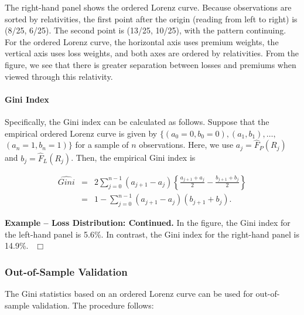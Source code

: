\documentclass[]{book}
\let\oldparagraph\paragraph
\renewcommand{\paragraph}[1]{\oldparagraph{#1}\mbox{}}
\theoremstyle{definition}
\theoremstyle{definition}
\theoremstyle{definition}
\theoremstyle{remark}
\begin{document}
The right-hand panel shows the ordered Lorenz curve. Because
observations are sorted by relativities, the first point after the
origin (reading from left to right) is (8/25, 6/25). The second point is
(13/25, 10/25), with the pattern continuing. For the ordered Lorenz
curve, the horizontal axis uses premium weights, the vertical axis uses
loss weights, and both axes are ordered by relativities. From the
figure, we see that there is greater separation between losses and
premiums when viewed through this relativity.

\paragraph{Gini Index}\label{gini-index}

Specifically, the Gini index can be calculated as follows. Suppose that
the empirical ordered Lorenz curve is given by
\(\{ (a_0=0, b_0=0), (a_1, b_1), \ldots,\) \((a_n=1, b_n=1) \}\) for a
sample of \(n\) observations. Here, we use \(a_j = \hat{F}_P(R_j)\) and
\(b_j = \hat{F}_{L}(R_j)\). Then, the empirical Gini index is

\begin{eqnarray}\label{E:GiniDefn}
\widehat{Gini} &=&  2\sum_{j=0}^{n-1} (a_{j+1} - a_j) \left \{
\frac{a_{j+1}+a_j}{2} - \frac{b_{j+1}+b_j}{2} \right\} \nonumber \\
&=& 1 - \sum_{j=0}^{n-1} (a_{j+1} - a_j) (b_{j+1}+b_j) .
\end{eqnarray}

\textbf{Example -- Loss Distribution: Continued.} In the figure, the
Gini index for the left-hand panel is 5.6\%. In contrast, the Gini index
for the right-hand panel is 14.9\%. \(~~\Box\)

\subsubsection{Out-of-Sample
Validation}\label{out-of-sample-validation-1}

The Gini statistics based on an ordered Lorenz curve can be used for
out-of-sample validation. The procedure follows:
\end{document}
